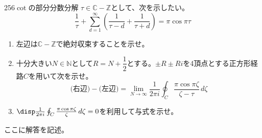 \begin{prob}{256}{}{$\cot$の部分分数分解}
 $\tau\in\mathbb{C}-\mathbb{Z}$として、次を示したい。
 \[ \frac{1}{\tau}+\sum_{d=1}^\infty\left(\frac{1}{\tau-d}+\frac{1}{\tau+d}\right)=\pi\cos\pi\tau \]
 \begin{enumerate}
  \item 左辺は$\mathbb{C}-\mathbb{Z}$で絶対収束することを示せ。
  \item 十分大きい$N\in\mathbb{N}$として$R=N+\dfrac{1}{2}$とする。$\pm R\pm Ri$を4頂点とする正方形経路$C$を用いて次を示せ。
	\[ \text{(右辺)}-\text{(左辺)}=\lim_{N\to\infty}\frac{1}{2\pi i}\oint_C\!\frac{\pi\cos\pi\zeta}{\zeta-\tau} \,d\zeta \]
  \item $\disp \frac{1}{2\pi i}\oint_C \frac{\pi\cos\pi\zeta}{\zeta} \,d\zeta=0$を利用して与式を示せ。
 \end{enumerate}
\end{prob}
ここに解答を記述。
